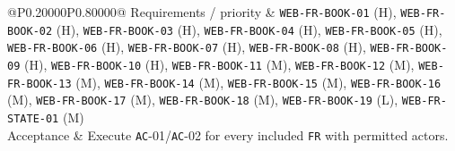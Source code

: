 \begin{longtable}{@{}P{0.20000\SRSWidth}P{0.80000\SRSWidth}@{}}
Requirements /\allowbreak{} priority & \texttt{WEB-\allowbreak{}FR-\allowbreak{}BOOK-\allowbreak{}01} (H), \texttt{WEB-\allowbreak{}FR-\allowbreak{}BOOK-\allowbreak{}02} (H), \texttt{WEB-\allowbreak{}FR-\allowbreak{}BOOK-\allowbreak{}03} (H), \texttt{WEB-\allowbreak{}FR-\allowbreak{}BOOK-\allowbreak{}04} (H), \texttt{WEB-\allowbreak{}FR-\allowbreak{}BOOK-\allowbreak{}05} (H), \texttt{WEB-\allowbreak{}FR-\allowbreak{}BOOK-\allowbreak{}06} (H), \texttt{WEB-\allowbreak{}FR-\allowbreak{}BOOK-\allowbreak{}07} (H), \texttt{WEB-\allowbreak{}FR-\allowbreak{}BOOK-\allowbreak{}08} (H), \texttt{WEB-\allowbreak{}FR-\allowbreak{}BOOK-\allowbreak{}09} (H), \texttt{WEB-\allowbreak{}FR-\allowbreak{}BOOK-\allowbreak{}10} (H), \texttt{WEB-\allowbreak{}FR-\allowbreak{}BOOK-\allowbreak{}11} (M), \texttt{WEB-\allowbreak{}FR-\allowbreak{}BOOK-\allowbreak{}12} (M), \texttt{WEB-\allowbreak{}FR-\allowbreak{}BOOK-\allowbreak{}13} (M), \texttt{WEB-\allowbreak{}FR-\allowbreak{}BOOK-\allowbreak{}14} (M), \texttt{WEB-\allowbreak{}FR-\allowbreak{}BOOK-\allowbreak{}15} (M), \texttt{WEB-\allowbreak{}FR-\allowbreak{}BOOK-\allowbreak{}16} (M), \texttt{WEB-\allowbreak{}FR-\allowbreak{}BOOK-\allowbreak{}17} (M), \texttt{WEB-\allowbreak{}FR-\allowbreak{}BOOK-\allowbreak{}18} (M), \texttt{WEB-\allowbreak{}FR-\allowbreak{}BOOK-\allowbreak{}19} (L), \texttt{WEB-\allowbreak{}FR-\allowbreak{}STATE-\allowbreak{}01} (M) \\[3pt]
Acceptance & Execute \texttt{AC}-01/\allowbreak{}\texttt{AC}-02 for every included \texttt{FR} with permitted actors. \\[3pt]
\end{longtable}
\endgroup

